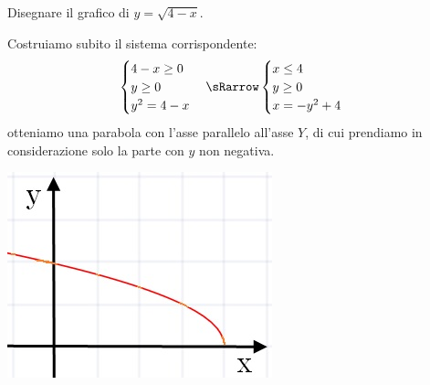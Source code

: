 \begin{esempio} Disegnare il grafico di $ y=\sqrt{4-x} $.\\[7pt]
\begin{minipage}{.65\textwidth}
\noindent  Costruiamo subito il sistema 
corrispondente:
\[\begin{cases}  4-x\geq0   \\ y\geq0  \\y^{2}=4-x 
\end{cases} \sRarrow
\begin{cases}   x\leq4   \\ y\geq0  \\ x=-y^{2}+4 
\end{cases}\]
otteniamo una parabola con l'asse parallelo all'asse $Y$, di cui 
prendiamo in considerazione solo la parte con $y$ non negativa.
  \end{minipage} \hspace{.7cm}
  \begin{minipage}{.25\textwidth}
  \includegraphics[width=\textwidth]{img/curva3.jpg}
\end{minipage}
  \end{esempio}


